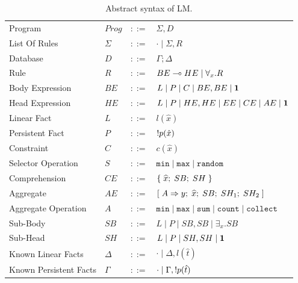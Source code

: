\begin{table}[h]
\centering
\begin{tabular}{ l l c l }
  Program & $Prog$ & $::=$ & $\Sigma, D$ \\
  List Of Rules & $\Sigma$ & $::=$ & $\cdot \; | \; \Sigma, R$\\
  Database & $D$ & $::=$ & $\Gamma; \Delta$ \\
  Rule & $R$ & $::=$ & $BE \multimap HE \; | \; \forall_{x}. R$ \\
  Body Expression & $BE$ & $::=$ & $L \; | \; P \; | \; C \; | \; BE, BE \; | \; \mathbf{1}$\\
  Head Expression & $HE$ & $::=$ & $L \; | \; P \; | \; HE, HE \; | \; EE \; |
  \; CE \; | \; AE \; | \; \mathbf{1}$\\
  
  Linear Fact & $L$ & $::=$ & $l(\hat{x})$\\
  Persistent Fact & $P$ & $::=$ & ${!} p(\hat{x})$\\
  Constraint & $C$ & $::=$ & $c(\hat{x})$ \\
  Selector Operation & $S$ & $::=$ & $\mathtt{min} \; | \; \mathtt{max} \; | \; \mathtt{random}$\\
  
  Comprehension & $CE$ & $::=$ & $\{ \; \widehat{x}; \; SB; \; SH \; \}$ \\

  Aggregate & $AE$ & $::=$ & $[\; A \Rightarrow y; \; \widehat{x}; \; SB; \; SH_1; \; SH_2 \;]$ \\
  Aggregate Operation & $A$ & $::=$ & $\mathtt{min} \; | \; \mathtt{max} \; | \;
\mathtt{sum} \; | \; \mathtt{count} \; | \; \mathtt{collect}$ \\
  
  Sub-Body & $SB$ & $::=$ & $L \; | \; P \; | \; SB, SB \; | \; \exists_{x}. SB$\\
  Sub-Head & $SH$ & $::=$ & $L \; | \; P \; | \; SH, SH \; | \; \mathbf{1}$\\
  
  Known Linear Facts & $\Delta$ & $::=$ & $\cdot \; | \; \Delta, l(\hat{t})$ \\
  Known Persistent Facts & $\Gamma$ & $::=$ & $\cdot \; | \; \Gamma, {!} p(\hat{t})$ \\
\end{tabular}
\caption{Abstract syntax of LM.}
\label{tbl:ast}
\end{table}

